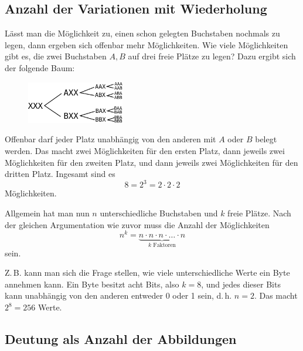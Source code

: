 \subsection{Anzahl der Variationen mit Wiederholung}%

Lässt man die Möglichkeit zu, einen schon gelegten Buchstaben
nochmals zu legen, dann ergeben sich offenbar mehr Möglichkeiten.
Wie viele Möglichkeiten gibt es, die zwei Buchstaben $A,B$
auf drei freie Plätze zu legen? Dazu ergibt sich der folgende
Baum:

\begin{figure}[h]
\begin{center}
\includegraphics[width=0.38\textwidth]{img/VariW-XXX-AB.pdf}
\end{center}
\end{figure}

\noindent
Offenbar darf jeder Platz unabhängig von den anderen mit $A$ oder
$B$ belegt werden. Das macht zwei Möglichkeiten für den ersten
Platz, dann jeweils zwei Möglichkeiten für den zweiten Platz,
und dann jeweils zwei Möglichkeiten für den dritten Platz.
Ingesamt sind es%
\[8 = 2^3 = 2\cdot 2\cdot 2\]
Möglichkeiten.

Allgemein hat man nun $n$ unterschiedliche Buchstaben und $k$
freie Plätze. Nach der gleichen Argumentation wie zuvor muss die
Anzahl der Möglichkeiten%
\[n^k = \underbrace{n\cdot n\cdot n\cdot\ldots\cdot n}_\text{$k$ Faktoren}\]
sein.

Z.\,B. kann man sich die Frage stellen, wie viele unterschiedliche
Werte ein Byte annehmen kann. Ein Byte besitzt acht Bits, also $k=8$,
und jedes dieser Bits kann unabhängig von den anderen entweder 0 oder 1
sein, d.\,h. $n=2$. Das macht $2^8=256$ Werte.

\subsection{Deutung als Anzahl der Abbildungen}

